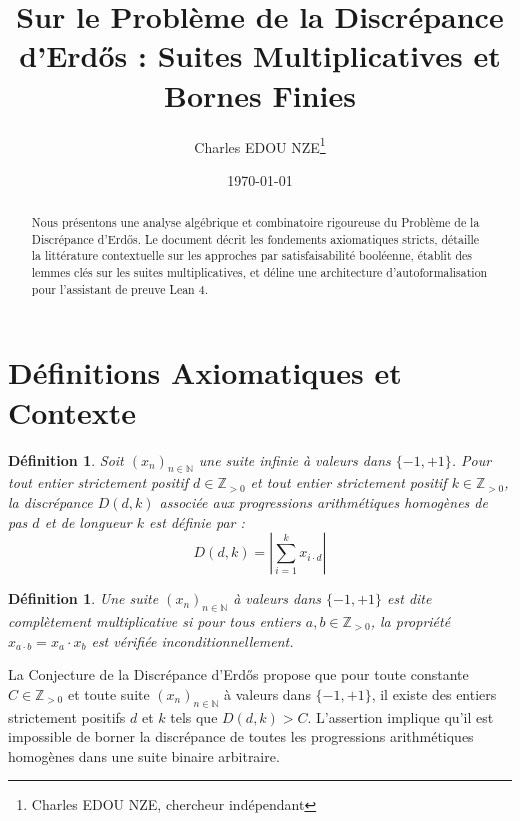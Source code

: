 \documentclass[12pt, a4paper]{article}
\title{Sur le Probl\`eme de la Discr\'epance d'Erd\H{o}s : Suites Multiplicatives et Bornes Finies}
\author{Charles EDOU NZE\thanks{Charles EDOU NZE, chercheur ind\'ependant}}
\date{\today}
\newtheorem{definition}[theorem]{D\'efinition}
\begin{document}
\maketitle

\begin{abstract}
Nous pr\'esentons une analyse alg\'ebrique et combinatoire rigoureuse du Probl\`eme de la Discr\'epance d'Erd\H{o}s. Le document d\'ecrit les fondements axiomatiques stricts, d\'etaille la litt\'erature contextuelle sur les approches par satisfaisabilit\'e bool\'eenne, \'etablit des lemmes cl\'es sur les suites multiplicatives, et d\'eline une architecture d'autoformalisation pour l'assistant de preuve Lean 4.
\end{abstract}

\tableofcontents
\newpage

\section{D\'efinitions Axiomatiques et Contexte}
\begin{definition}
Soit $(x_n)_{n \in \mathbb{N}}$ une suite infinie \`a valeurs dans $\{-1, +1\}$.
Pour tout entier strictement positif $d \in \mathbb{Z}_{>0}$ et tout entier strictement positif $k \in \mathbb{Z}_{>0}$, la discr\'epance $D(d, k)$ associ\'ee aux progressions arithm\'etiques homog\`enes de pas $d$ et de longueur $k$ est d\'efinie par :
\[ D(d, k) = \left| \sum_{i=1}^k x_{i \cdot d} \right| \]
\end{definition}

\begin{definition}
Une suite $(x_n)_{n \in \mathbb{N}}$ \`a valeurs dans $\{-1, +1\}$ est dite compl\`etement multiplicative si pour tous entiers $a, b \in \mathbb{Z}_{>0}$, la propri\'et\'e $x_{a \cdot b} = x_a \cdot x_b$ est v\'erifi\'ee inconditionnellement.
\end{definition}

La Conjecture de la Discr\'epance d'Erd\H{o}s propose que pour toute constante $C \in \mathbb{Z}_{>0}$ et toute suite $(x_n)_{n \in \mathbb{N}}$ \`a valeurs dans $\{-1, +1\}$, il existe des entiers strictement positifs $d$ et $k$ tels que $D(d, k) > C$. L'assertion implique qu'il est impossible de borner la discr\'epance de toutes les progressions arithm\'etiques homog\`enes dans une suite binaire arbitraire.
\end{document}
